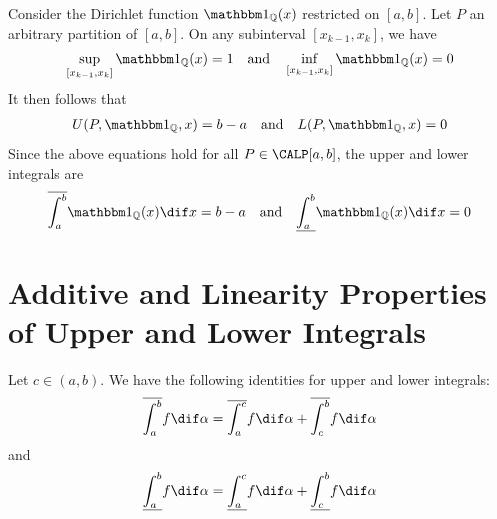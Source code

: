 \documentclass[thmcnt=section, color=blue, 12pt]{my-elegantbook}
\begin{document}
\begin{example}
	Consider the Dirichlet function $\ind_{\Q}(x)$ restricted on $[a, b]$.
	Let $P$ an arbitrary partition of $[a, b]$.
	On any subinterval $[x_{k-1}, x_k]$, we have
	\begin{align*}
		\sup_{[x_{k-1}, x_k]} \ind_{\Q}(x) = 1
		\quad \text{and} \quad
		\inf_{[x_{k-1}, x_k]} \ind_{\Q}(x) = 0
	\end{align*}
	It then follows that
	\begin{align*}
		U(P, \ind_\Q, x) = b - a
		\quad \text{and} \quad
		L(P, \ind_\Q, x) = 0
	\end{align*}
	Since the above equations hold for all $P \in \CALP[a, b]$,
	the upper and lower integrals are
	\begin{align*}
		\overline{\int_a^b} \ind_{\Q}(x) \dif x = b - a
		\quad \text{and} \quad
		\underline{\int_a^b} \ind_{\Q}(x) \dif x = 0
	\end{align*}
\end{example}



\section{Additive and Linearity Properties of Upper and Lower Integrals}

\begin{proposition}
	Let $c\in (a, b)$.
	We have the following identities for upper and lower integrals:
	\begin{align*}
		\overline{\int_a^b} f \dif \alpha
		= \overline{\int_a^c} f \dif \alpha + \overline{\int_c^b} f \dif \alpha
	\end{align*}
	and
	\begin{align*}
		\underline{\int_a^b} f \dif \alpha
		= \underline{\int_a^c} f \dif \alpha + \underline{\int_c^b} f \dif \alpha
	\end{align*}
\end{proposition}
\end{document}
